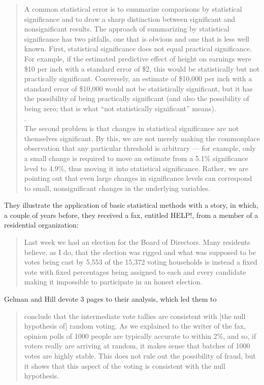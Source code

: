 \documentclass[]{book}
\begin{document}
\begin{quote}
A common statistical error is to summarize comparisons by statistical significance and to draw a sharp distinction between significant and nonsignificant results. The approach of summarizing by statistical significance has two pitfalls, one that is obvious and one that is less well known.
First, statistical significance does not equal practical significance. For example, if the estimated predictive effect of height on earnings were \$10 per inch with a standard error of \$2, this would be statistically but not practically significant. Conversely, an estimate of \$10,000 per inch with a standard error of \$10,000 would not be statistically significant, but it has the possibility of being practically significant (and also the possibility of being zero; that is what ``not statistically significant'' means).\\
.\\
The second problem is that changes in statistical significance are not themselves significant. By this, we are not merely making the commonplace observation that any particular threshold is arbitrary --- for example, only a small change is required to move an estimate from a 5.1\% significance level to 4.9\%, thus moving it into statistical significance. Rather, we are pointing out that even large changes in significance levels can correspond to small, nonsignificant changes in the underlying variables.
\end{quote}

They illustrate the application of basic statistical methods with a story, in which, a couple of years before, they received a fax, entitled HELP!, from a member of a residential organization:

\begin{quote}
Last week we had an election for the Board of Directors. Many residents believe, as I do, that the election was rigged and what was supposed to be votes being cast by 5,553 of the 15,372 voting households is instead a fixed vote with fixed percentages being assigned to each and every candidate making it impossible to participate in an honest election.
\end{quote}

Gelman and Hill devote 3 pages to their analysis, which led them to

\begin{quote}
conclude that the intermediate vote tallies are consistent with {[}the null hypothesis of{]} random voting. As we explained to the writer of the fax, opinion polls of 1000 people are typically accurate to within 2\%, and so, if voters really are arriving at random, it makes sense that batches of 1000 votes are highly stable. This does not rule out the possibility of fraud, but it shows that this aspect of the voting is consistent with the null hypothesis.
\end{quote}
\end{document}
